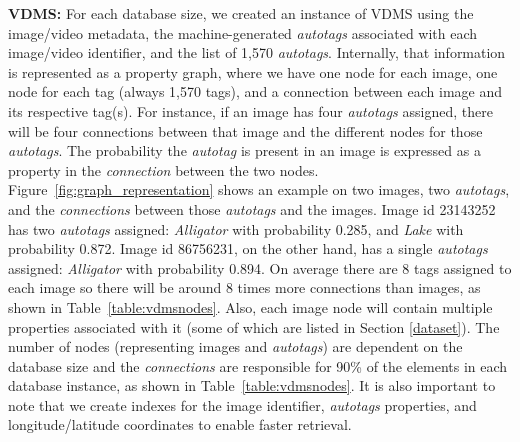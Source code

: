 \textbf{VDMS:}
For each database size, we created an instance of VDMS using the image/video metadata,
the machine-generated \textit{autotags} associated with
each image/video identifier, and the list of 1,570 \textit{autotags}.
Internally, that information is represented as a property graph,
where we have one node for each image, one node for each tag
(always 1,570 tags), and a connection between each image and its respective tag(s).
For instance, if an image has four \textit{autotags} assigned,
there will be four connections between that image and
the different nodes for those \textit{autotags}.
The probability the \textit{autotag} is present in an image
is expressed as a property in the \textit{connection} between the two nodes.
Figure~\ref{fig:graph_representation} shows an example on two images,
two \textit{autotags}, and the \textit{connections} between
those \textit{autotags} and the images.
Image id 23143252 has two \textit{autotags} assigned:
\textit{Alligator} with probability 0.285, and \textit{Lake} with probability 0.872.
Image id 86756231, on the other hand, has a single \textit{autotags} assigned:
\textit{Alligator} with probability 0.894.
On average there are 8 tags assigned to each image so
there will be around 8 times more connections than images, as shown
in Table~\ref{table:vdmsnodes}.
Also, each image node will contain multiple properties associated
with it (some of which are listed in Section \ref{dataset}).
The number of nodes (representing images and \textit{autotags})
are dependent on the database size and the \textit{connections} are responsible for
90\% of the elements in each database instance,
as shown in Table~\ref{table:vdmsnodes}.
It is also important to note that we create indexes for the image identifier,
\textit{autotags} properties, and longitude/latitude coordinates
to enable faster retrieval.

